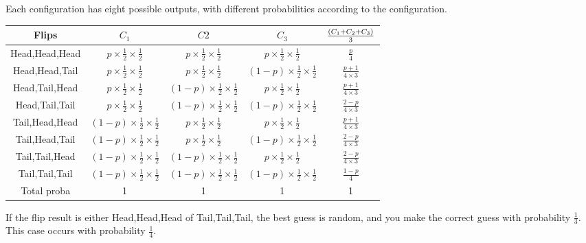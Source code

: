 \documentclass[11pt]{article}
\begin{document}
Each configuration has eight possible outputs, with different probabilities according to the configuration.
\renewcommand{\arraystretch}{1.5}
\begin{center}
\begin{tabular}{|c|c|c|c|c|}
\hline
Flips &$C_1$&$C2$&$C_3$&$(C_1+C_2+C_3)\over{3}$\\ \hline
Head,Head,Head&$p\times \frac{1}{2}\times \frac{1}{2}$&$p\times \frac{1}{2}\times \frac{1}{2}$&$p\times \frac{1}{2}\times \frac{1}{2}$&$\frac{p}{4}$\\ \hline
Head,Head,Tail &$p\times \frac{1}{2}\times \frac{1}{2}$&$p\times \frac{1}{2}\times \frac{1}{2}$&$(1-p)\times \frac{1}{2}\times \frac{1}{2}$&$\frac{p+1}{4\times 3}$ \\ \hline
Head,Tail,Head &$p\times \frac{1}{2}\times \frac{1}{2}$&$(1-p)\times \frac{1}{2}\times \frac{1}{2}$&$p\times \frac{1}{2}\times \frac{1}{2}$&$\frac{p+1}{4\times 3}$  \\ \hline
Head,Tail,Tail &$p\times \frac{1}{2}\times \frac{1}{2}$&$(1-p)\times \frac{1}{2}\times \frac{1}{2}$&$(1-p)\times \frac{1}{2}\times \frac{1}{2}$&$\frac{2-p}{4\times 3}$  \\ \hline
Tail,Head,Head &$(1-p)\times \frac{1}{2}\times \frac{1}{2}$&$p\times \frac{1}{2}\times \frac{1}{2}$&$p\times \frac{1}{2}\times \frac{1}{2}$&$\frac{p+1}{4\times 3}$ \\ \hline
Tail,Head,Tail &$(1-p)\times \frac{1}{2}\times \frac{1}{2}$&$p\times \frac{1}{2}\times \frac{1}{2}$&$(1-p)\times \frac{1}{2}\times \frac{1}{2}$& $\frac{2-p}{4\times 3}$ \\ \hline
Tail,Tail,Head &$(1-p)\times \frac{1}{2}\times \frac{1}{2}$&$(1-p)\times \frac{1}{2}\times \frac{1}{2}$& $p\times \frac{1}{2}\times \frac{1}{2}$&$\frac{2-p}{4\times 3}$ \\ \hline
Tail,Tail,Tail &$(1-p)\times \frac{1}{2}\times \frac{1}{2}$&$(1-p)\times \frac{1}{2}\times \frac{1}{2}$&$(1-p)\times \frac{1}{2}\times \frac{1}{2}$ &$\frac{1-p}{4}$\\ \hline\hline
Total proba&1&1&1&1\\ \hline
\end{tabular}
\end{center}

If the flip result is either Head,Head,Head of Tail,Tail,Tail, the best guess is random, and you make the correct guess with probability $\frac{1}{3}$. This case occurs with probability $\frac{1}{4}$.
\end{document}
